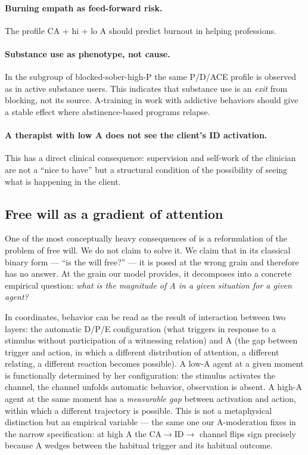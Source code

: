 \paragraph{Burning empath as feed-forward risk.} The profile CA + hi \EAF{} + lo A should predict burnout in helping professions.

\paragraph{Substance use as phenotype, not cause.} In the subgroup of blocked-sober-high-P the same P/D/ACE profile is observed as in active substance users. This indicates that substance use is an \emph{exit} from blocking, not its source. A-training in work with addictive behaviors should give a stable effect where abstinence-based programs relapse.

\paragraph{A therapist with low A does not see the client's ID activation.} This has a direct clinical consequence: supervision and self-work of the clinician are not a ``nice to have'' but a structural condition of the possibility of seeing what is happening in the client.

\subsection{Free will as a gradient of attention}
\label{subsec:free_will}

One of the most conceptually heavy consequences of \DEIC{} is a reformulation of the problem of free will. We do not claim to solve it. We claim that in its classical binary form --- ``is the will free?'' --- it is posed at the wrong grain and therefore has no answer. At the grain our model provides, it decomposes into a concrete empirical question: \emph{what is the magnitude of A in a given situation for a given agent?}

In \DEIC{} coordinates, behavior can be read as the result of interaction between two layers: the automatic D/P/E configuration (what triggers in response to a stimulus without participation of a witnessing relation) and A (the gap between trigger and action, in which a different distribution of attention, a different relating, a different reaction becomes possible). A low-A agent at a given moment is functionally determined by her configuration: the stimulus activates the channel, the channel unfolds automatic behavior, observation is absent. A high-A agent at the same moment has a \emph{measurable gap} between activation and action, within which a different trajectory is possible. This is not a metaphysical distinction but an empirical variable --- the same one our A-moderation fixes in the narrow specification: at high A the CA$\to$ID$\to$\EAF{} channel flips sign precisely because A wedges between the habitual trigger and its habitual outcome.

